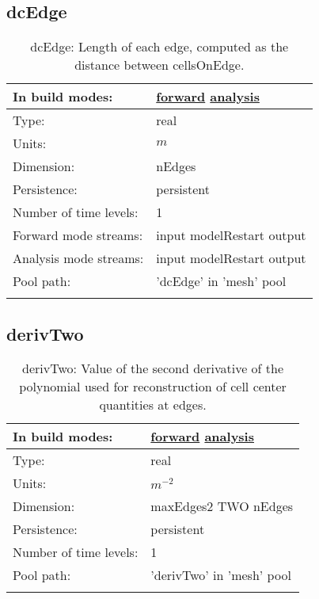 \subsection[dcEdge]{dcEdge}
\label{subsec:var_sec_mesh_dcEdge}
\begin{center}
\begin{longtable}{| p{2.0in} | p{4.0in} |}
        \hline 
        In build modes: & \hyperref[subsec:forward_var_tab_mesh]{forward} \hyperref[subsec:analysis_var_tab_mesh]{analysis} \\
        \hline 
        Type: & real \\
        \hline 
        Units: & $m$ \\
        \hline 
        Dimension: & nEdges \\
        \hline 
        Persistence: & persistent \\
        \hline 
        Number of time levels: & 1 \\
        \hline 
		 Forward mode streams: &  input modelRestart output \\
        \hline 
		 Analysis mode streams: &  input modelRestart output \\
        \hline 
            Pool path: & 'dcEdge' in 'mesh' pool
 \\
		 \hline 
    \caption{dcEdge: Length of each edge, computed as the distance between cellsOnEdge.}
\end{longtable}
\end{center}
\subsection[derivTwo]{derivTwo}
\label{subsec:var_sec_mesh_derivTwo}
\begin{center}
\begin{longtable}{| p{2.0in} | p{4.0in} |}
        \hline 
        In build modes: & \hyperref[subsec:forward_var_tab_mesh]{forward} \hyperref[subsec:analysis_var_tab_mesh]{analysis} \\
        \hline 
        Type: & real \\
        \hline 
        Units: & $m^{-2}$ \\
        \hline 
        Dimension: & maxEdges2 TWO nEdges \\
        \hline 
        Persistence: & persistent \\
        \hline 
        Number of time levels: & 1 \\
        \hline 
            Pool path: & 'derivTwo' in 'mesh' pool
 \\
		 \hline 
    \caption{derivTwo: Value of the second derivative of the polynomial used for reconstruction of cell center quantities at edges.}
\end{longtable}
\end{center}
